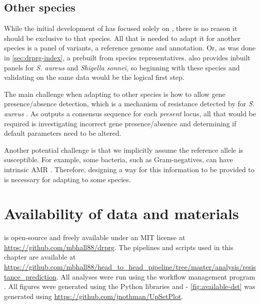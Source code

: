 \subsection{Other species}

While the initial development of \drprg{} has focused solely on \mtb{}, there is no reason it should be exclusive to that species. All that is needed to adapt it for another species is a panel of variants, a reference genome and annotation. Or, as was done in \autoref{sec:drprg-index}, a prebuilt \panrg{} from species representatives. \mykrobe{} also provides inbuilt panels for \textit{S. aureus} and \textit{Shigella sonnei}, so beginning with these species and validating on the same data would be the logical first step. 

The main challenge when adapting to other species is how to allow gene presence/absence detection, which is a mechanism of resistance detected by \mykrobe{} for \textit{S. aureus} \cite{bradley2015}. As \pandora{} outputs a consensus sequence for each \emph{present} locus, all that would be required is investigating incorrect gene presence/absence and determining if default parameters need to be altered.

Another potential challenge is that we implicitly assume the reference allele is susceptible. For example, some bacteria, such as Gram-negatives, can have intrinsic AMR \cite{Venter2017}. Therefore, designing a way for this information to be provided to \drprg{} is necessary for adapting \drprg{} to some species.

\section{Availability of data and materials}

\drprg{} is open-source and freely available under an MIT license at \url{https://github.com/mbhall88/drprg}. The pipelines and scripts used in this chapter are available at \url{https://github.com/mbhall88/head_to_head_pipeline/tree/master/analysis/resistance_prediction}. All analyses were run using the workflow management program  \cite{snakemake2021}. All figures were generated using the Python libraries  \cite{matplotlib} and  \cite{seaborn} - \autoref{fig:available-dst} was generated using \url{https://github.com/jnothman/UpSetPlot}.
